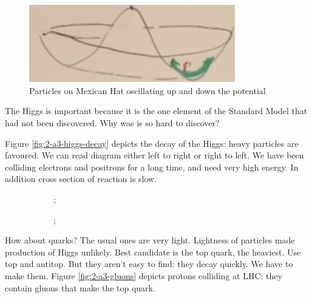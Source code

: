 \documentclass[]{article}
\begin{document}
\begin{figure}[H]
	\caption{Particles on Mexican Hat oscillating up and down the potential}\label{fig:2-a3-higgs1}
	\includegraphics[width=0.8\textwidth]{2-a3-higgs1}
\end{figure}

The Higgs is important because it is the one element of the Standard Model that had not been discovered. Why was is so hard to discover?

Figure \ref{fig:2-a3-higgs-decay} depicts the decay of the Higgs: heavy particles are favoured. We can read diagram either left to right or right to left. We have been colliding electrons and positrons for a long time, and need very high energy. In addition cross section of reaction is slow.

\begin{figure}[H]
	\begin{center}
		\caption{Higgs decaying: probability $\propto$ mass of particles produced}\label{fig:2-a3-higgs-decay}
		\begin{subfigure}[t]{0.45\textwidth}
			;
		\end{subfigure}
		\hfill
		\begin{subfigure}[t]{0.45\textwidth}
			;
		\end{subfigure}

	\end{center}
\end{figure}

How about quarks? The usual ones are very light. Lightness of particles made production of Higgs unlikely. Best candidate is the top quark, the heaviest. Use top and antitop. But they aren't easy to find: they decay quickly. We have to make them. Figure \ref{fig:2-a3-gluons} depicts protons colliding at LHC: they contain gluons that make the top quark. 
\end{document}
